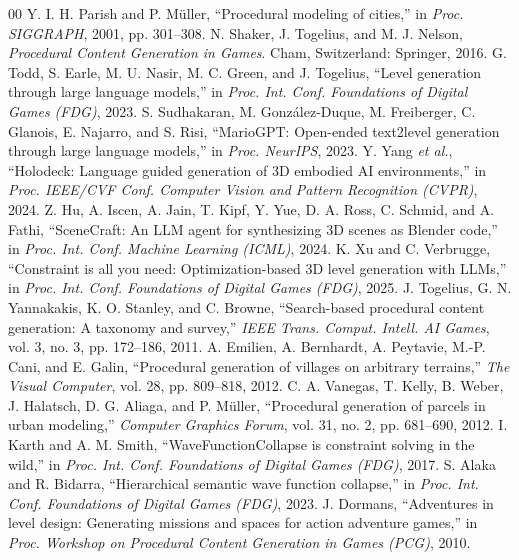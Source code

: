 \documentclass[conference]{IEEEtran}
\begin{document}
\begin{thebibliography}{00}
 Y. I. H. Parish and P. M\"uller, ``Procedural modeling of cities,'' in \textit{Proc. SIGGRAPH}, 2001, pp. 301--308.
 N. Shaker, J. Togelius, and M. J. Nelson, \textit{Procedural Content Generation in Games}. Cham, Switzerland: Springer, 2016.
 G. Todd, S. Earle, M. U. Nasir, M. C. Green, and J. Togelius, ``Level generation through large language models,'' in \textit{Proc. Int. Conf. Foundations of Digital Games (FDG)}, 2023.
 S. Sudhakaran, M. Gonz\'alez-Duque, M. Freiberger, C. Glanois, E. Najarro, and S. Risi, ``MarioGPT: Open-ended text2level generation through large language models,'' in \textit{Proc. NeurIPS}, 2023.
 Y. Yang \textit{et al.}, ``Holodeck: Language guided generation of 3D embodied AI environments,'' in \textit{Proc. IEEE/CVF Conf. Computer Vision and Pattern Recognition (CVPR)}, 2024.
 Z. Hu, A. Iscen, A. Jain, T. Kipf, Y. Yue, D. A. Ross, C. Schmid, and A. Fathi, ``SceneCraft: An LLM agent for synthesizing 3D scenes as Blender code,'' in \textit{Proc. Int. Conf. Machine Learning (ICML)}, 2024.
 K. Xu and C. Verbrugge, ``Constraint is all you need: Optimization-based 3D level generation with LLMs,'' in \textit{Proc. Int. Conf. Foundations of Digital Games (FDG)}, 2025.
 J. Togelius, G. N. Yannakakis, K. O. Stanley, and C. Browne, ``Search-based procedural content generation: A taxonomy and survey,'' \textit{IEEE Trans. Comput. Intell. AI Games}, vol. 3, no. 3, pp. 172--186, 2011.
 A. Emilien, A. Bernhardt, A. Peytavie, M.-P. Cani, and E. Galin, ``Procedural generation of villages on arbitrary terrains,'' \textit{The Visual Computer}, vol. 28, pp. 809--818, 2012.
 C. A. Vanegas, T. Kelly, B. Weber, J. Halatsch, D. G. Aliaga, and P. M\"uller, ``Procedural generation of parcels in urban modeling,'' \textit{Computer Graphics Forum}, vol. 31, no. 2, pp. 681--690, 2012.
 I. Karth and A. M. Smith, ``WaveFunctionCollapse is constraint solving in the wild,'' in \textit{Proc. Int. Conf. Foundations of Digital Games (FDG)}, 2017.
 S. Alaka and R. Bidarra, ``Hierarchical semantic wave function collapse,'' in \textit{Proc. Int. Conf. Foundations of Digital Games (FDG)}, 2023.
 J. Dormans, ``Adventures in level design: Generating missions and spaces for action adventure games,'' in \textit{Proc. Workshop on Procedural Content Generation in Games (PCG)}, 2010.

\end{thebibliography}
\end{document}
